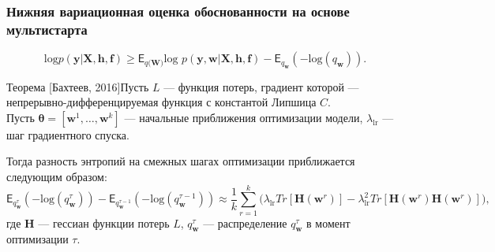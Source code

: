 \documentclass[usenames,dvipsnames,11pt,pdf,utf8,russian,aspectratio=43]{beamer}
\begin{document}
\begin{frame}
\small
\frametitle{Нижняя вариационная оценка обоснованности на основе мультистарта}
$$\text{log}p(\mathbf{y}|\mathbf{X}, \mathbf{h},\mathbf{f}) \geq \mathsf{E}_{q(\mathbf{W)}}\text{log~}p (\mathbf{y}, \mathbf{w}|\mathbf{X}, \mathbf{h},\mathbf{f}) - \mathsf{E}_{q_{\mathbf{w}}}(-\text{log}(q_\mathbf{w})).$$

\begin{block}{Теорема [Бахтеев, 2016]}Пусть $L$ --- функция потерь, градиент которой ---  непрерывно-дифференцируемая функция с константой Липшица $C$. \\
Пусть $\boldsymbol{\theta} = [\mathbf{w}^1,\dots,\mathbf{w}^k]$ ---  начальные приближения оптимизации модели, $\lambda_\text{lr}$ --- шаг градиентного спуска.

Тогда разность энтропий на смежных шагах оптимизации приближается следующим образом:
\small
\[
	\mathsf{E}_{q^{\tau}_{\mathbf{w}}}(-\text{log}(q^{\tau}_\mathbf{w})) -  \mathsf{E}_{q^{\tau-1}_{\mathbf{w}}}(-\text{log}(q^{\tau-1}_\mathbf{w}))  \approx  \frac{1}{k}\sum_{r=1}^k \bigl(\lambda_\text{lr} Tr[\mathbf{H}(\mathbf{w}^r)] - \lambda_\text{lr}^2 Tr[\mathbf{H}(\mathbf{w}^r)\mathbf{H}(\mathbf{w}^r)]  \bigr),
\]
где $\mathbf{H}$ --- гессиан функции потерь $L$, $q^{\tau}_\mathbf{w}$ --- распределение $q^{\tau}_\mathbf{w}$ в момент оптимизации $\tau$.
\end{block}
\end{frame}
\end{document}

